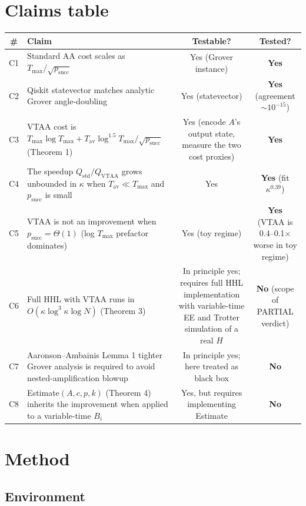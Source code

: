\documentclass[11pt]{article}
\begin{document}
\section{Claims table}

\begin{longtable}{c p{7cm} c c}
\toprule
\# & Claim & Testable? & Tested? \\
\midrule
C1 & Standard AA cost scales as $T_{\max}/\sqrt{p_{\mathrm{succ}}}$ &
Yes (Grover instance) & \textbf{Yes} \\
C2 & Qiskit statevector matches analytic Grover angle-doubling &
Yes (statevector) & \textbf{Yes} (agreement $\sim 10^{-15}$) \\
C3 & VTAA cost is $T_{\max}\log T_{\max} + T_{\mathrm{av}}\log^{1.5} T_{\max}
    / \sqrt{p_{\mathrm{succ}}}$ (Theorem 1) &
Yes (encode $A$'s output state, measure the two cost proxies) &
\textbf{Yes} \\
C4 & The speedup $Q_{\mathrm{std}}/Q_{\mathrm{VTAA}}$ grows unbounded in $\kappa$
    when $T_{\mathrm{av}} \ll T_{\max}$ and $p_{\mathrm{succ}}$ is small &
Yes & \textbf{Yes} (fit $\kappa^{0.39}$) \\
C5 & VTAA is not an improvement when $p_{\mathrm{succ}} = \Theta(1)$
    (log $T_{\max}$ prefactor dominates) & Yes (toy regime) &
\textbf{Yes} (VTAA is 0.4--0.1$\times$ worse in toy regime) \\
C6 & Full HHL with VTAA runs in $O(\kappa \log^3 \kappa \log N)$
    (Theorem 3) & In principle yes; requires full HHL implementation
    with variable-time EE and Trotter simulation of a real $H$ &
\textbf{No} (scope of PARTIAL verdict) \\
C7 & Aaronson--Ambainis Lemma 1 tighter Grover analysis is required
    to avoid nested-amplification blowup & In principle yes; here treated
    as black box & \textbf{No} \\
C8 & Estimate$(A,c,p,k)$ (Theorem 4) inherits the improvement when
    applied to a variable-time $B_i$ & Yes, but requires implementing
    Estimate & \textbf{No} \\
\bottomrule
\end{longtable}

\section{Method}

\subsection{Environment}
\end{document}
